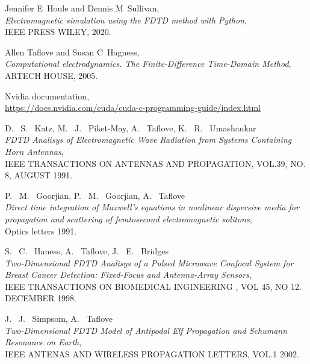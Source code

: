 \documentclass[11pt,a4paper,twoside,pdf]{article}
\numberwithin{equation}{section}
\begin{document}
\begin{thebibliography}{100}

  Jennifer E~Houle and Dennis M~Sullivan, \\
  {\em Electromagnetic simulation using the FDTD method with Python}, \\
  IEEE PRESS WILEY, 2020.
  
  Allen Taflove and Susan C~Hagness, \\
  {\em Computational electrodynamics. The Finite-Difference Time-Domain Method}, \\
  ARTECH HOUSE, 2005.

 Nvidia documentation, \\
 \href{https://docs.nvidia.com/cuda/cuda-c-programming-guide/index.html}{https://docs.nvidia.com/cuda/cuda-c-programming-guide/index.html}
 
  D.~ S.~ Katz, M.~ J.~ Piket-May, A.~ Taflove, K.~ R.~ Umashankar \\
  {\em FDTD Analisys of Electromagnetic Wave Radiation from Systems Containing Horn Antennas}, \\
  IEEE TRANSACTIONS ON ANTENNAS AND PROPAGATION, VOL.39, NO. 8, AUGUST 1991.

  P.~ M.~ Goorjian, P.~  M.~ Goorjian, A.~ Taflove \\
  {\em Direct time integration of Maxwell's equations in nonlinear dispersive media for propagation and scattering of femtosecond electromagnetic solitons}, \\
  Optics letters 1991.
  
  S.~ C.~ Haness, A.~ Taflove, J.~ E.~ Bridges \\
  {\em Two-Dimensional FDTD Analisys of a Pulsed Microwave Confocal System for Breast Cancer Detection: Fixed-Focus and Antenna-Array Sensors}, \\
  IEEE TRANSACTIONS ON BIOMEDICAL INGINEERING , VOL 45, NO 12. DECEMBER 1998.

  J.~ J.~ Simpsom, A.~ Taflove\\
  {\em Two-Dimensional FDTD Model of Antipodal Elf Propagation and Schumann Resonance on Earth}, \\
  IEEE ANTENAS AND WIRELESS PROPAGATION LETTERS, VOL.1 2002.


\end{thebibliography}
\end{document}
